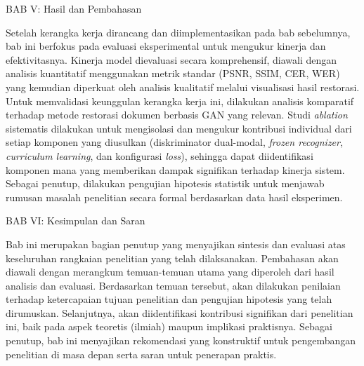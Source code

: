 \documentclass[12pt,a4paper]{book}
\begin{document}
\vspace{0.5em}
BAB V: Hasil dan Pembahasan

Setelah kerangka kerja dirancang dan diimplementasikan pada bab sebelumnya, bab ini berfokus pada evaluasi eksperimental untuk mengukur kinerja dan efektivitasnya. Kinerja model dievaluasi secara komprehensif, diawali dengan analisis kuantitatif menggunakan metrik standar (PSNR, SSIM, CER, WER) yang kemudian diperkuat oleh analisis kualitatif melalui visualisasi hasil restorasi. Untuk memvalidasi keunggulan kerangka kerja ini, dilakukan analisis komparatif terhadap metode restorasi dokumen berbasis GAN yang relevan. Studi \textit{ablation} sistematis dilakukan untuk mengisolasi dan mengukur kontribusi individual dari setiap komponen yang diusulkan (diskriminator dual-modal, \textit{frozen recognizer}, \textit{curriculum learning}, dan konfigurasi \textit{loss}), sehingga dapat diidentifikasi komponen mana yang memberikan dampak signifikan terhadap kinerja sistem. Sebagai penutup, dilakukan pengujian hipotesis statistik untuk menjawab rumusan masalah penelitian secara formal berdasarkan data hasil eksperimen.

\vspace{0.5em}
BAB VI: Kesimpulan dan Saran

Bab ini merupakan bagian penutup yang menyajikan sintesis dan evaluasi atas keseluruhan rangkaian penelitian yang telah dilaksanakan. Pembahasan akan diawali dengan merangkum temuan-temuan utama yang diperoleh dari hasil analisis dan evaluasi. Berdasarkan temuan tersebut, akan dilakukan penilaian terhadap ketercapaian tujuan penelitian dan pengujian hipotesis yang telah dirumuskan. Selanjutnya, akan diidentifikasi kontribusi signifikan dari penelitian ini, baik pada aspek teoretis (ilmiah) maupun implikasi praktisnya. Sebagai penutup, bab ini menyajikan rekomendasi yang konstruktif untuk pengembangan penelitian di masa depan serta saran untuk penerapan praktis.




\end{document}
